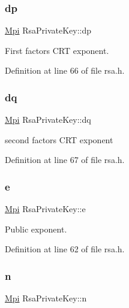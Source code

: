 \subsubsection{\texorpdfstring{dp}{dp}}
{\footnotesize\ttfamily \hyperlink{structMpi}{Mpi} Rsa\+Private\+Key\+::dp}



First factor\textquotesingle{}s C\+RT exponent. 



Definition at line 66 of file rsa.\+h.

\mbox{\label{structRsaPrivateKey_a9e72909ef8af48ce9a813ba32ba0287d}} 
\subsubsection{\texorpdfstring{dq}{dq}}
{\footnotesize\ttfamily \hyperlink{structMpi}{Mpi} Rsa\+Private\+Key\+::dq}



second factor\textquotesingle{}s C\+RT exponent 



Definition at line 67 of file rsa.\+h.

\mbox{\label{structRsaPrivateKey_a590822495b6caceae5f8880cacc51b9c}} 
\subsubsection{\texorpdfstring{e}{e}}
{\footnotesize\ttfamily \hyperlink{structMpi}{Mpi} Rsa\+Private\+Key\+::e}



Public exponent. 



Definition at line 62 of file rsa.\+h.

\mbox{\label{structRsaPrivateKey_aaccaccd76db1a21201bf06eb6ecdd8ac}} 
\subsubsection{\texorpdfstring{n}{n}}
{\footnotesize\ttfamily \hyperlink{structMpi}{Mpi} Rsa\+Private\+Key\+::n}



